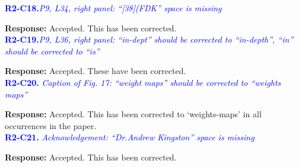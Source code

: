 \documentclass{article}
\begin{document}
\textcolor{blue}{\textbf{R2-C18.}\textit{P9, L34, right panel: ``[38](FDK'' space is missing}}
 
 \textbf{Response:} Accepted. This has been corrected.\\

 \textcolor{blue}{\textbf{R2-C19.}\textit{P9, L36, right panel: ``in-dept'' should be corrected to ``in-depth'', ``in'' should be corrected to ``is''}}
 
 \textbf{Response:} Accepted. These have been corrected.\\

 \textcolor{blue}{\textbf{R2-C20.}\textit{ Caption of Fig. 17: ``weight maps'' should be corrected to ``weights maps''}}
 
\textbf{ Response:} Accepted. This has been corrected to `weights-maps' in all occurrences in the paper.\\

 \textcolor{blue}{\textbf{R2-C21.}\textit{ Acknowledgement: ``Dr.Andrew Kingston'' space is missing}}
 
\textbf{ Response:} Accepted. This has been corrected.      





\end{document}
